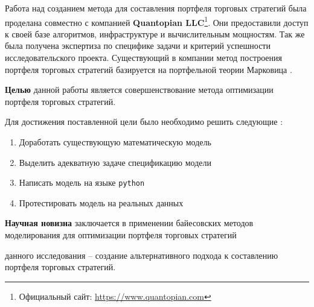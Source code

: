 Работа над созданием метода для составления портфеля торговых стратегий была проделана совместно с компанией \textbf{Quantopian LLC}\footnote{Официальный сайт: \href{https://www.quantopian.com}{https://www.quantopian.com}}. Они предоставили доступ к своей базе алгоритмов, инфраструктуре и вычислительным мощностям. Так же была получена экспертиза по специфике задачи и критерий успешности исследовательского проекта. Существующий в компании метод построения портфеля торговых стратегий базируется на портфельной теории Марковица \citep{markovitz1959}. 

\textbf{Целью} данной работы является совершенствование метода оптимизации портфеля торговых стратегий.

Для достижения поставленной цели было необходимо решить следующие {\tasks}:
\begin{enumerate}
  \item Доработать существующую математическую модель
  \item Выделить адекватную задаче спецификацию модели
  \item Написать модель на языке \texttt{python}
  \item Протестировать модель на реальных данных
\end{enumerate}

\textbf{Научная новизна} заключается в применении байесовских методов моделирования  для оптимизации портфеля торговых стратегий

{\influence} данного исследования -- создание альтернативного подхода к составлению портфеля торговых стратегий.
